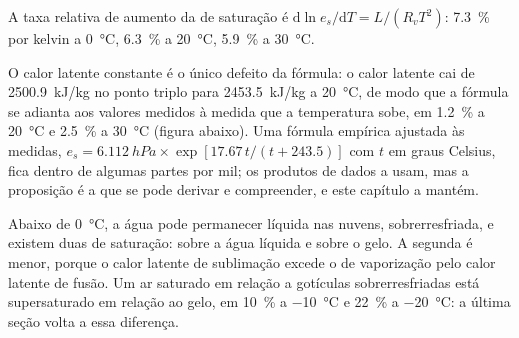 \begin{corollary}\label{cor:b2:atmospheric-thermodynamics:seven}
A taxa relativa de aumento da  de saturação é
$\mathrm{d}\ln e_s/\mathrm{d}T = L/(R_v T^2)$: \qty{7.3}{\percent} por kelvin a
\qty{0}{\celsius}, \qty{6.3}{\percent} a \qty{20}{\celsius}, \qty{5.9}{\percent} a
\qty{30}{\celsius}.
\end{corollary}

O calor latente constante é o único defeito da fórmula: o calor latente cai de
\qty{2500.9}{kJ/kg} no ponto triplo para \qty{2453.5}{kJ/kg} a \qty{20}{\celsius}, de modo que a
fórmula se adianta aos valores medidos à medida que a temperatura sobe, em \qty{1.2}{\percent} a
\qty{20}{\celsius} e \qty{2.5}{\percent} a \qty{30}{\celsius} (figura abaixo). Uma fórmula
empírica ajustada às medidas, $e_s = \qty{6.112}{hPa} \times \exp[17.67\,t/(t + 243.5)]$ com
$t$ em graus Celsius, fica dentro de algumas partes por mil; os produtos de dados a usam, mas a
proposição é a que se pode derivar e compreender, e este capítulo a mantém.

Abaixo de \qty{0}{\celsius}, a água pode permanecer líquida nas nuvens, sobrerresfriada, e existem duas  de saturação: sobre a água líquida e sobre o gelo. A segunda é menor, porque o calor latente
de sublimação excede o de vaporização pelo calor latente de fusão. Um ar saturado em
relação a gotículas sobrerresfriadas está supersaturado em relação ao gelo, em \qty{10}{\percent} a
\qty{-10}{\celsius} e \qty{22}{\percent} a \qty{-20}{\celsius}: a última seção volta a
essa diferença.

